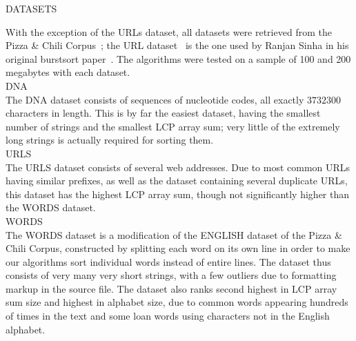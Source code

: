 {\sffamily\normalsize{\color{sciorange}DATASETS}}\vspace{-7mm}\small\\
 \footnotesize 
\begin{multicols}{3}
With the exception of the URLs dataset, all datasets were retrieved from
the Pizza \& Chili Corpus~\cite{fn2005}; the URL dataset~\cite{sinha} is the one used by Ranjan Sinha
in his original burstsort paper~\cite{sw2008}. The algorithms were tested on a sample
of 100 and 200 megabytes with each dataset.\vspace{1.5mm}\\
{\sffamily\normalsize{\color{sciorange}DNA}}\small\\
\footnotesize 
The DNA dataset consists of sequences of nucleotide codes, all exactly $3732300$
characters in length.  This is by far the easiest dataset, having the smallest
number of strings and the smallest LCP array sum; very little of the extremely
long strings is actually required for sorting them.\vspace{1.5mm}\\
{\sffamily\normalsize{\color{sciorange}URLS}}\small\\
\footnotesize 
The URLS dataset consists of several web addresses.  Due to most common URLs
having similar prefixes, as well as the dataset containing several duplicate
URLs, this dataset has the highest LCP array sum, though not significantly
higher than the WORDS dataset.\vspace{1.5mm}\\
{\sffamily\normalsize{\color{sciorange}WORDS}}\small\\
\footnotesize 
The WORDS dataset is a modification of the ENGLISH dataset of the Pizza \& Chili
Corpus, constructed by splitting each word on its own line in order to make our
algorithms sort individual words instead of entire lines.  The dataset thus
consists of very many very short strings, with a few outliers due to formatting
markup in the source file.  The dataset also ranks second highest in LCP array
sum size and highest in alphabet size, due to common words appearing hundreds of
times in the text and some loan words using characters not in the English
alphabet.
\end{multicols}